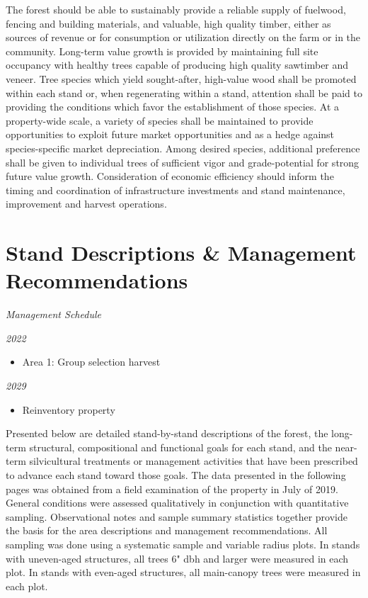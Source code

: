 \documentclass[]{tufte-handout}
\begin{document}
The forest should be able to sustainably provide a reliable supply of
fuelwood, fencing and building materials, and valuable, high quality
timber, either as sources of revenue or for consumption or utilization
directly on the farm or in the community. Long-term value growth is
provided by maintaining full site occupancy with healthy trees capable
of producing high quality sawtimber and veneer. Tree species which yield
sought-after, high-value wood shall be promoted within each stand or,
when regenerating within a stand, attention shall be paid to providing
the conditions which favor the establishment of those species. At a
property-wide scale, a variety of species shall be maintained to provide
opportunities to exploit future market opportunities and as a hedge
against species-specific market depreciation. Among desired species,
additional preference shall be given to individual trees of sufficient
vigor and grade-potential for strong future value growth. Consideration
of economic efficiency should inform the timing and coordination of
infrastructure investments and stand maintenance, improvement and
harvest operations.

\section{Stand Descriptions \& Management
Recommendations}\label{stand-descriptions-management-recommendations}

\begin{marginfigure}
\noindent \textit{\LARGE Management Schedule}
\vspace{10pt}

\noindent \textit{\large 2022}

\begin{itemize}
  \item Area 1: Group selection harvest  
\end{itemize}

\vspace{10pt}  
\noindent \textit{\large 2029}  

\begin{itemize}
  \item Reinventory property
\end{itemize}
\end{marginfigure}

Presented below are detailed stand-by-stand descriptions of the forest,
the long-term structural, compositional and functional goals for each
stand, and the near-term silvicultural treatments or management
activities that have been prescribed to advance each stand toward those
goals. The data presented in the following pages was obtained from a
field examination of the property in July of 2019. General conditions
were assessed qualitatively in conjunction with quantitative sampling.
Observational notes and sample summary statistics together provide the
basis for the area descriptions and management recommendations. All
sampling was done using a systematic sample and variable radius plots.
In stands with uneven-aged structures, all trees 6" dbh and larger were
measured in each plot. In stands with even-aged structures, all
main-canopy trees were measured in each plot.
\end{document}
